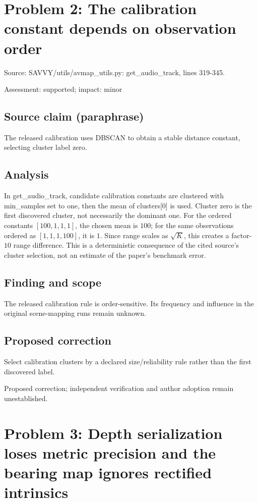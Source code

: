 \documentclass[11pt]{article}
\begin{document}
\section*{Problem 2: The calibration constant depends on observation order}

Source: SAVVY/utils/avmap\_utils.py: get\_audio\_track, lines 319-345.

Assessment: supported; impact: minor

\subsection*{Source claim (paraphrase)}

The released calibration uses DBSCAN to obtain a stable distance constant, selecting cluster label zero.

\subsection*{Analysis}

In get\_audio\_track, candidate calibration constants are clustered with min\_samples set to one, then the mean of clusters[\(0\)] is used. Cluster zero is the first discovered cluster, not necessarily the dominant one. For the ordered constants \([100,1,1,1]\), the chosen mean is \(100\); for the same observations ordered as \([1,1,1,100]\), it is \(1\). Since range scales as \(\sqrt K\), this creates a factor-\(10\) range difference. This is a deterministic consequence of the cited source's cluster selection, not an estimate of the paper's benchmark error.

\subsection*{Finding and scope}

The released calibration rule is order-sensitive. Its frequency and influence in the original scene-mapping runs remain unknown.

\subsection*{Proposed correction}

Select calibration clusters by a declared size/reliability rule rather than the first discovered label.

Proposed correction; independent verification and author adoption remain unestablished.

\section*{Problem 3: Depth serialization loses metric precision and the bearing map ignores rectified intrinsics}
\end{document}

